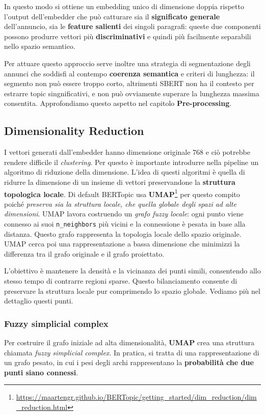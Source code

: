 In questo modo si ottiene un embedding unico di dimensione doppia rispetto l'output dell'embedder che può catturare sia il \textbf{significato generale} dell'annuncio, sia le \textbf{feature salienti} dei singoli paragrafi: queste due componenti possono produrre vettori più \textbf{discriminativi} e quindi più facilmente separabili nello spazio semantico.

Per attuare questo approccio serve inoltre una strategia di segmentazione degli annunci che soddisfi al contempo \textbf{coerenza semantica} e criteri di lunghezza: il segmento non può essere troppo corto, altrimenti SBERT non ha il contesto per estrarre topic singnificativi, e non può ovviamente superare la lunghezza massima consentita. Approfondiamo questo aspetto nel capitolo \textbf{Pre-processing}.
\subsection{Dimensionality Reduction}
I vettori generati dall'embedder hanno dimensione originale 768 e ciò potrebbe rendere difficile il \emph{clustering}. Per questo è importante introdurre nella pipeline un algoritmo di riduzione della dimensione.
L'idea di questi algoritmi è quella di ridurre la dimensione di un insieme di vettori preservandone la \textbf{struttura topologica locale}.
Di default BERTopic usa \textbf{UMAP}\footnote{\url{https://maartengr.github.io/BERTopic/getting_started/dim_reduction/dim_reduction.html}} per questo compito poiché \emph{preserva sia la struttura locale, che quella globale degli spazi ad alte dimensioni}.
UMAP lavora costruendo un \textit{grafo fuzzy locale}: ogni punto viene connesso ai suoi \texttt{n\_neighbors} più vicini e la connessione è pesata in base alla distanza. Questo grafo rappresenta la topologia locale dello spazio originale.
UMAP cerca poi una rappresentazione a bassa dimensione che minimizzi la differenza tra il grafo originale e il grafo proiettato.

L'obiettivo è mantenere la densità e la vicinanza dei punti simili, consentendo allo stesso tempo di contrarre regioni sparse.
Questo bilanciamento consente di preservare la struttura locale pur comprimendo lo spazio globale.
Vediamo più nel dettaglio questi punti.
\subsubsection{Fuzzy simplicial complex}
Per costruire il grafo iniziale ad alta dimensionalità, \textbf{UMAP} crea una struttura chiamata \textit{fuzzy simplicial complex}. In pratica, si tratta di una rappresentazione di un grafo pesato, in cui i pesi degli archi rappresentano la \textbf{probabilità che due punti siano connessi}.

